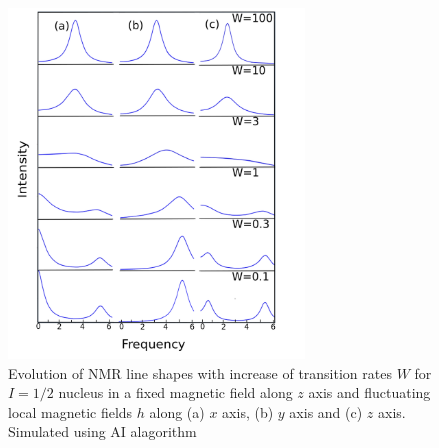 \begin{figure}[h!]
\centering
\includegraphics[width=0.7\textwidth]{figures/chap2/blumediag.png}
\caption{Evolution of NMR line shapes with increase of transition rates $W$ for $I=1/2$ nucleus in a fixed magnetic field along $z$ axis and fluctuating local magnetic fields $h$ along (a) $x$ axis, (b) $y$ axis and (c) $z$ axis. Simulated using AI alagorithm}
\label{figure:blumediag}
\end{figure}
\clearpage
